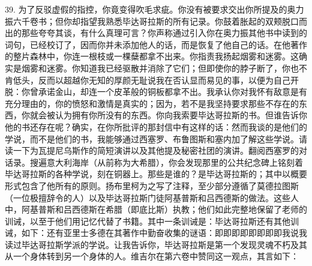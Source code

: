 39. 为了反驳虚假的指控，你竟变得吹毛求疵。你没有被要求交出你所提及的奥力振六千卷书；但你却指望我熟悉毕达哥拉斯的所有记录。你鼓着胀起的双颊脱口而出的那些夸夸其谈，有什么真理可言？你声称通过引入你在奥力振其他书中读到的词句，已经校订了，因而你并未添加他人的话，而是恢复了他自己的话。在他著作的整片森林中，你连一根枝或一棵蘖都拿不出来。你指责我扬起烟雾和迷雾。这确实是烟雾和迷雾。你知道我已经驱散并消除了它们；但即使你的脖子断了，你也不肯低头，反而以超越你无知的厚颜无耻说我在否认显而易见的事，以便为自己开脱：你曾承诺金山，却连一个皮革般的铜板都拿不出。我承认你对我怀有敌意是有充分理由的，你的愤怒和激情是真实的；因为，若不是我坚持要求那些不存在的东西，你就会被认为拥有你所没有的东西。你向我索要毕达哥拉斯的书。但谁告诉你他的书还存在呢？确实，在你所批评的那封信中有这样的话：然而我谈的是他们的学说，而不是他们的书，我能够通过西塞罗、布鲁图斯和塞内加了解这些学说。请读一下为瓦提尼乌斯作的简短演讲以及其他提及秘密社团的演讲。翻阅西塞罗的对话录。搜遍意大利海岸（从前称为大希腊），你会发现那里的公共纪念碑上铭刻着毕达哥拉斯的各种学说，刻在铜器上。那些是谁的？是毕达哥拉斯的；其中以概要形式包含了他所有的原则。扬布里柯为之写了注释，至少部分遵循了莫德拉图斯（一位极擅辞令的人）以及毕达哥拉斯门徒阿基普斯和吕西德斯的做法。这些人中，阿基普斯和吕西德斯在希腊（即底比斯）执教；他们如此完整地保留了老师的训诫，以至于他们用记忆代替了书籍。其中一条训诫是：毕达哥拉斯还有其他训诫，如下：还有亚里士多德在其著作中勤奋收集的谜语：即即即即即即即即我说我读过毕达哥拉斯学派的学说。让我告诉你，毕达哥拉斯是第一个发现灵魂不朽及其从一个身体转到另一个身体的人。维吉尔在第六卷中赞同这一观点，其言如下：\par

